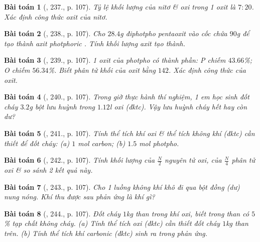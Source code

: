 \documentclass{article}
\newtheorem{baitoan}{Bài toán}
\begin{document}
\begin{baitoan}[\cite{An_400_BT_Hoa_Hoc_8_2020}, 237., p. 107]
	Tỷ lệ khối lượng của nitơ \& oxi trong 1 oxit là $7:20$. Xác định công thức oxit của nitơ.
\end{baitoan}

\begin{baitoan}[\cite{An_400_BT_Hoa_Hoc_8_2020}, 238., p. 107]
	Cho $28.4$\emph{g} điphotpho pentaoxit \emph{} vào cốc chứa $90$\emph{g} \emph{} để tạo thành axit photphoric \emph{}. Tính khối lượng axit \emph{} tạo thành.
\end{baitoan}

\begin{baitoan}[\cite{An_400_BT_Hoa_Hoc_8_2020}, 239., p. 107]
	1 oxit của photpho có thành phần: \emph{P} chiếm $43.66$\%; \emph{O} chiếm $56.34$\%. Biết phân tử khối của oxit bằng $142$. Xác định công thức của oxit.
\end{baitoan}

\begin{baitoan}[\cite{An_400_BT_Hoa_Hoc_8_2020}, 240., p. 107]
	Trong giờ thực hành thí nghiệm, 1 em học sinh đốt cháy $3.2$\emph{g} bột lưu huỳnh trong $1.12$\emph{l} oxi (đktc). Vậy lưu huỳnh cháy hết hay còn dư?
\end{baitoan}

\begin{baitoan}[\cite{An_400_BT_Hoa_Hoc_8_2020}, 241., p. 107]
	Tính thể tích khí oxi \& thể tích không khí (đktc) cần thiết để đốt cháy: (a) $1$ \emph{mol} carbon; (b) $1.5$ \emph{mol} photpho.
\end{baitoan}

\begin{baitoan}[\cite{An_400_BT_Hoa_Hoc_8_2020}, 242., p. 107]
	Tính khối lượng của $\frac{N}{2}$ nguyên tử oxi, của $\frac{N}{4}$ phân tử oxi \& so sánh 2 kết quả này.
\end{baitoan}

\begin{baitoan}[\cite{An_400_BT_Hoa_Hoc_8_2020}, 243., p. 107]
	Cho 1 luồng không khí khô đi qua bột đồng (dư) nung nóng. Khí thu được sau phản ứng là khí gì?
\end{baitoan}

\begin{baitoan}[\cite{An_400_BT_Hoa_Hoc_8_2020}, 244., p. 107]
	Đốt cháy $1$\emph{kg} than trong khí oxi, biết trong than có $5$\% tạp chất không cháy. (a) Tính thể tích oxi (đktc) cần thiết đốt cháy $1$\emph{kg} than trên. (b) Tính thể tích khí carbonic (đktc) sinh ra trong phản ứng.
\end{baitoan}
\end{document}
